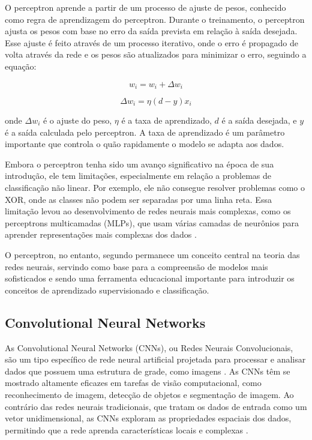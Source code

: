 O perceptron aprende a partir de um processo de ajuste de pesos, conhecido como regra de aprendizagem do perceptron. Durante o treinamento, o perceptron ajusta os pesos com base no erro da saída prevista em relação à saída desejada. Esse ajuste é feito através de um processo iterativo, onde o erro é propagado de volta através da rede e os pesos são atualizados para minimizar o erro, seguindo a equação:

\[
w_i = w_i + \Delta w_i
\]

\[
\Delta w_i = \eta (d - y) x_i
\]

onde \( \Delta w_i \) é o ajuste do peso, \( \eta \) é a taxa de aprendizado, \( d \) é a saída desejada, e \( y \) é a saída calculada pelo perceptron. A taxa de aprendizado é um parâmetro importante que controla o quão rapidamente o modelo se adapta aos dados.

Embora o perceptron tenha sido um avanço significativo na época de sua introdução, ele tem limitações, especialmente em relação a problemas de classificação não linear. Por exemplo, ele não consegue resolver problemas como o XOR, onde as classes não podem ser separadas por uma linha reta. Essa limitação levou ao desenvolvimento de redes neurais mais complexas, como os perceptrons multicamadas (MLPs), que usam várias camadas de neurônios para aprender representações mais complexas dos dados \cite{bishop2006pattern}. %

O perceptron, no entanto, segundo  permanece um conceito central na teoria das redes neurais, servindo como base para a compreensão de modelos mais sofisticados e sendo uma ferramenta educacional importante para introduzir os conceitos de aprendizado supervisionado e classificação.


\subsection{Convolutional Neural Networks}

As Convolutional Neural Networks (CNNs), ou Redes Neurais Convolucionais, são um tipo específico de rede neural artificial projetada para processar e analisar dados que possuem uma estrutura de grade, como imagens \cite{o2015introduction}. As CNNs têm se mostrado altamente eficazes em tarefas de visão computacional, como reconhecimento de imagem, detecção de objetos e segmentação de imagem. Ao contrário das redes neurais tradicionais, que tratam os dados de entrada como um vetor unidimensional, as CNNs exploram as propriedades espaciais dos dados, permitindo que a rede aprenda características locais e complexas \cite{nielsen2015neural}.

